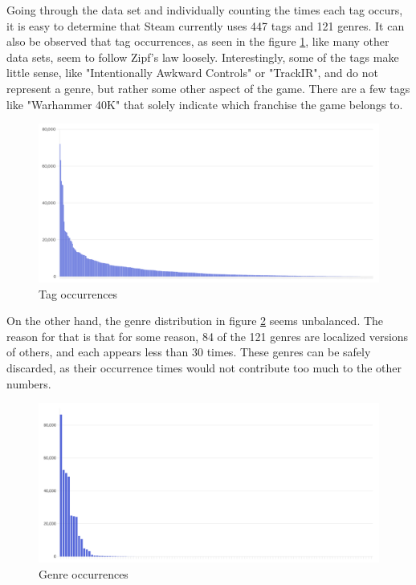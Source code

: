 Going through the data set and individually counting the times each tag occurs, it is easy to determine that Steam currently uses 447 tags and 121 genres. It can also be observed that tag occurrences, as seen in the figure \ref{figure:tags}, like many other data sets, seem to follow Zipf's law loosely\cite{li2002zipf}. Interestingly, some of the tags make little sense, like "Intentionally Awkward Controls" or "TrackIR", and do not represent a genre, but rather some other aspect of the game. There are a few tags like "Warhammer 40K" that solely indicate which franchise the game belongs to.

\begin{figure}[h]
    \centering
    \includegraphics[width=\textwidth]{images/tag-occurrences.png}
    \caption{Tag occurrences}
    \label{figure:tags}
\end{figure}

On the other hand, the genre distribution in figure \ref{figure:genres} seems unbalanced. The reason for that is that for some reason, 84 of the 121 genres are localized versions of others, and each appears less than 30 times. These genres can be safely discarded, as their occurrence times would not contribute too much to the other numbers.

\begin{figure}[h]
    \centering
    \includegraphics[width=\textwidth]{images/genre-occurrences.png}
    \caption{Genre occurrences}
    \label{figure:genres}
\end{figure}

